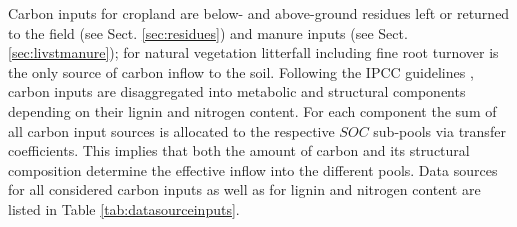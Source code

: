 \documentclass[gc, manuscript]{copernicus}
\begin{document}
Carbon inputs for cropland are below- and above-ground residues left or returned to the field (see Sect. \ref{sec:residues}) and manure inputs (see Sect. \ref{sec:livstmanure}); for natural vegetation litterfall including fine root turnover \citep{schaphoff_lpjml4_2018} is the only source of carbon inflow to the soil. Following the IPCC guidelines \citep{calvo_buendia_ipcc_2019}, carbon inputs are disaggregated into metabolic and structural components depending on their lignin and nitrogen content. For each component the sum of all carbon input sources is allocated to the respective \(SOC\) sub-pools via transfer coefficients. This implies that both the amount of carbon and its structural composition determine the effective inflow into the different pools. Data sources for all considered carbon inputs as well as for lignin and nitrogen content are listed in Table \ref{tab:datasourceinputs}.
\end{document}
